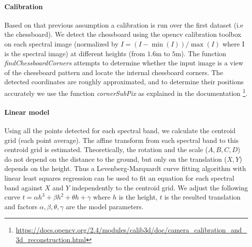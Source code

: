 \documentclass[]{elsarticle}
\begin{document}
	\paragraph{Calibration}
	Based on that previous assumption a calibration is run over the first dataset (i.e the chessboard).
	We detect the chessboard using the opencv calibration toolbox \cite{Bouguet2001CameraCT}
	on each spectral image (normalized by $I = (I-\min(I))/\max(I)$ where I is the spectral image) at different heights (from $1.6\si{\meter}$ to $5\si{\meter}$).
	The function \textit{findChessboardCorners} attempts to determine whether the input image is a view of the chessboard pattern and locate the internal chessboard corners.
	The detected coordinates are roughly approximated, and to determine their positions accurately we use the function \textit{cornerSubPix} as explained in the documentation \footnote{\url{https://docs.opencv.org/2.4/modules/calib3d/doc/camera_calibration_and_3d_reconstruction.html}}.
	
	\paragraph{Linear model}
	
	Using all the points detected for each spectral band, we calculate the centroid grid (each point average).
	The affine transform from each spectral band to this centroid grid is estimated.
	Theoretically, the rotation and the scale ($A,B,C,D$) do not depend on the distance to the ground, but only on the translation ($X,Y$) depends on the height.
	Thus a Levenberg-Marquardt curve fitting algorithm with linear least squares regression \cite{More78}
	can be used to fit an equation for each spectral band against $X$ and $Y$ independently to the centroid grid.
	We adjust the following curve $t = \alpha h^3 + \beta h^2 + \theta h + \gamma$ where $h$ is the height,
	$t$ is the resulted translation and factors $\alpha,\beta,\theta,\gamma$ are the model parameters.
	
\end{document}
